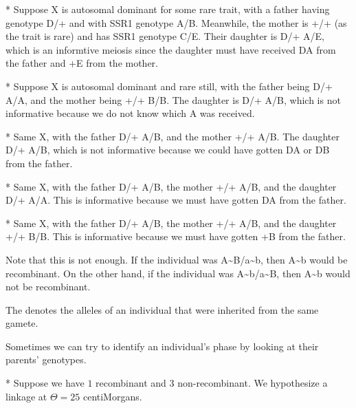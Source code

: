 \begin{exm}*
	Suppose X is autosomal dominant for some rare trait, with a father having genotype D/+ and with SSR1 genotype A/B.
	Meanwhile, the mother is +/+ (as the trait is rare) and has SSR1 genotype C/E.
	Their daughter is D/+ A/E, which is an informtive meiosis since the daughter must have received DA from the father and +E from the mother.
\end{exm}

\begin{exm}*
	Suppose X is autosomal dominant and rare still, with the father being D/+ A/A, and the mother being +/+ B/B. The daughter is D/+ A/B, which is not informative because we do not know which A was received.
\end{exm}

\begin{exm}*
	Same X, with the father D/+ A/B, and the mother +/+ A/B. The daughter D/+ A/B, which is not informative because we could have gotten DA or DB from the father.
\end{exm}

\begin{exm}*
	Same X, with the father D/+ A/B, the mother +/+ A/B, and the daughter D/+ A/A. This is informative because we must have gotten DA from the father.
\end{exm}	

\begin{exm}*
	Same X, with the father D/+ A/B, the mother +/+ A/B, and the daughter +/+ B/B. This is informative because we must have gotten +B from the father.
\end{exm}

Note that this is not enough. If the individual was A\sim B/a\sim b, then A\sim b would be recombinant. On the other hand, if the individual was A\sim b/a\sim B, then A\sim b would not be recombinant.

\begin{defn}
	The  denotes the alleles of an individual that were inherited from the same gamete.
\end{defn}

Sometimes we can try to identify an individual's phase by looking at their parents' genotypes.

\begin{exm}*
	Suppose we have $1$ recombinant and $3$ non-recombinant. 
	We hypothesize a linkage at $\Theta = 25$ centiMorgans.
\end{exm}

